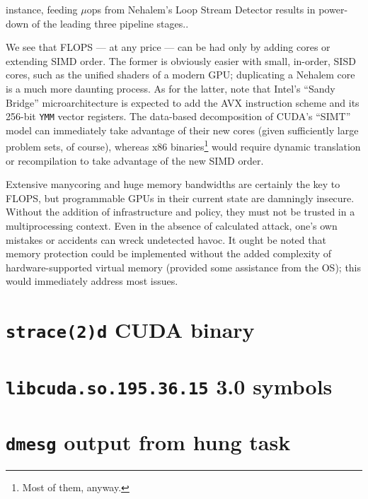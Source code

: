 \documentclass[letterpaper,10pt]{article}
\begin{document}
\begin{multicols}{2}
\begin{itemize}
{instance, feeding $\mu$ops from Nehalem's Loop Stream Detector results in power-down
of the leading three pipeline stages.}.
\end{itemize}
We see that FLOPS --- at any price --- can be had only by adding cores or extending
SIMD order. The former is obviously easier with small, in-order, SISD cores,
such as the unified shaders of a modern GPU\@; duplicating a Nehalem core is a
much more daunting process. As for the latter, note that Intel's ``Sandy
Bridge'' microarchitecture is expected to add the AVX instruction scheme and
its 256-bit \texttt{YMM} vector registers\cite{avx}\cite{fma4}. The data-based decomposition of CUDA's
``SIMT'' model can immediately take advantage of their new cores (given
sufficiently large problem sets, of course), whereas x86 binaries\footnote{Most of them, anyway.} would
require dynamic translation or recompilation to take advantage of the new SIMD
order.

Extensive manycoring and huge memory bandwidths are certainly the key to FLOPS,
but programmable GPUs in their current state are damningly insecure. Without the
addition of infrastructure and policy, they must not be trusted in a
multiprocessing context. Even in the absence of calculated attack, one's own
mistakes or accidents can wreck undetected havoc. It ought be noted that memory
protection could be implemented without the added complexity of
hardware-supported virtual memory (provided some assistance from the OS); this
would immediately address most issues.



\end{multicols}
\appendix
\newpage
\section{\texttt{strace(2)d} CUDA binary}\label{strace}
\newpage
\section{\texttt{libcuda.so.195.36.15} 3.0 symbols}\label{strace}
\section{\texttt{dmesg} output from hung task}\label{oops}
\end{document}
